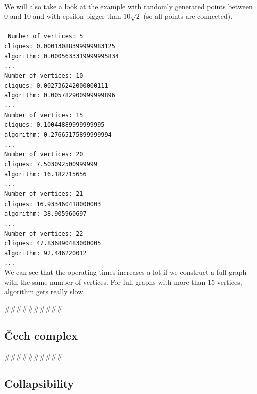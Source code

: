 \documentclass[a4paper,11pt]{article}
\begin{document}
\\
We will also take a look at the example with randomly generated points between 0 and 10 and with epsilon bigger than $10 \sqrt{2}$ (so all points are connected).
\\
\\
\texttt{
Number of vertices: 5 \\
cliques: 0.00013088399999983125 \\
algorithm: 0.0005633319999995834 \\
... \\
Number of vertices: 10 \\
cliques: 0.002736242000000111 \\
algorithm: 0.005782900999999896 \\
... \\
Number of vertices: 15 \\
cliques: 0.10044889999999995 \\
algorithm: 0.27665175899999994 \\
... \\
Number of vertices: 20 \\
cliques: 7.503092500999999 \\
algorithm: 16.182715656 \\
... \\
Number of vertices: 21 \\
cliques: 16.933460418000003 \\
algorithm: 38.905960697 \\
... \\
Number of vertices: 22 \\
cliques: 47.836890483000005 \\
algorithm: 92.446220012 \\
... 
}
\\
We can see that the operating times increases a lot if we construct a full graph with the same number of vertices.
For full graphs with more than 15 vertices, algorithm gets really slow.

##########

\subsection{Čech complex}

##########

\subsection{Collapsibility}
\end{document}
